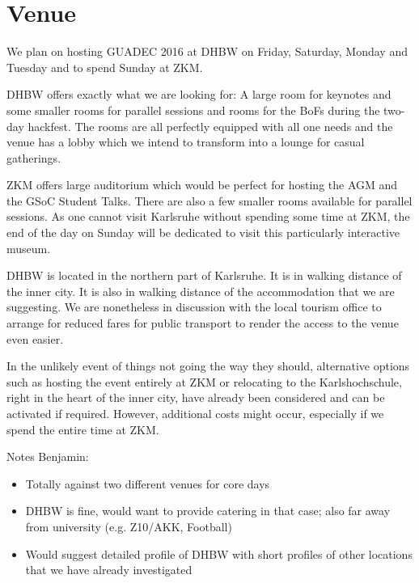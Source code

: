 
\section{Venue}


We plan on hosting GUADEC 2016 at DHBW on Friday, Saturday, Monday and 
Tuesday and to spend Sunday at ZKM.

DHBW offers exactly what we are looking for: A large room for keynotes 
and some smaller rooms for parallel sessions and rooms for the BoFs 
during the two-day hackfest. The rooms are all perfectly equipped with 
all one needs and the venue has a lobby which we intend to transform 
into a lounge for casual gatherings.

ZKM offers large auditorium which would be perfect for hosting the AGM 
and the GSoC Student Talks. There are also a few smaller rooms 
available for parallel sessions. As one cannot visit Karlsruhe without 
spending some time at ZKM, the end of the day on Sunday will be 
dedicated to visit this particularly interactive museum.

DHBW is located in the northern part of Karlsruhe. It is in walking 
distance of the inner city. It is also in walking distance of the 
accommodation that we are suggesting. We are nonetheless in discussion 
with the local tourism office to arrange for reduced fares for public 
transport to render the access to the venue even easier.

In the unlikely event of things not going the way they should, 
alternative options such as hosting the event entirely at ZKM or 
relocating to the Karlshochschule, right in the heart of the inner 
city, have already been considered and can be activated if required. 
However, additional costs might occur, especially if we spend the 
entire time at ZKM.


Notes Benjamin:
\begin{itemize}
 \item Totally against two different venues for core days
 \item DHBW is fine, would want to provide catering in that case; also far away from university (e.g. Z10/AKK, Football)
 \item Would suggest detailed profile of DHBW with short profiles of other locations that we have already investigated
\end{itemize}
